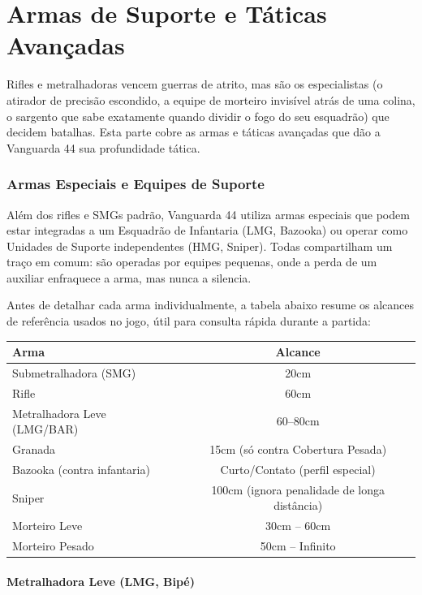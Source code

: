 \part{Armas de Suporte e Táticas Avançadas}

Rifles e metralhadoras vencem guerras de atrito, mas são os especialistas (o atirador de precisão escondido, a equipe de morteiro invisível atrás de uma colina, o sargento que sabe exatamente quando dividir o fogo do seu esquadrão) que decidem batalhas. Esta parte cobre as armas e táticas avançadas que dão a Vanguarda 44 sua profundidade tática.

\section{Armas Especiais e Equipes de Suporte}

Além dos rifles e SMGs padrão, Vanguarda 44 utiliza armas especiais que podem estar integradas a um Esquadrão de Infantaria (LMG, Bazooka) ou operar como Unidades de Suporte independentes (HMG, Sniper). Todas compartilham um traço em comum: são operadas por equipes pequenas, onde a perda de um auxiliar enfraquece a arma, mas nunca a silencia.

Antes de detalhar cada arma individualmente, a tabela abaixo resume os alcances de referência usados no jogo, útil para consulta rápida durante a partida:

\begin{center}
\begin{tabular}{lc}
\toprule
Arma & Alcance \\
\midrule
Submetralhadora (SMG) & 20cm \\
Rifle & 60cm \\
Metralhadora Leve (LMG/BAR) & 60--80cm \\
Granada & 15cm (só contra Cobertura Pesada) \\
Bazooka (contra infantaria) & Curto/Contato (perfil especial) \\
Sniper & 100cm (ignora penalidade de longa distância) \\
Morteiro Leve & 30cm -- 60cm \\
Morteiro Pesado & 50cm -- Infinito \\
\bottomrule
\end{tabular}
\end{center}

\subsection{Metralhadora Leve (LMG, Bipé)}

